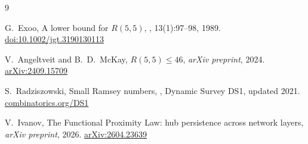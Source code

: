\documentclass[11pt]{article}
\begin{document}

\begin{thebibliography}{9}

G.~Exoo,
\newblock A lower bound for $R(5,5)$,
, 13(1):97--98, 1989.
\newblock \href{https://doi.org/10.1002/jgt.3190130113}{doi:10.1002/jgt.3190130113}

V.~Angeltveit and B.~D.~McKay,
\newblock $R(5,5) \leq 46$,
\newblock \emph{arXiv preprint}, 2024.
\newblock \href{https://arxiv.org/abs/2409.15709}{arXiv:2409.15709}

S.~Radziszowski,
\newblock Small Ramsey numbers,
, Dynamic Survey DS1, updated 2021.
\newblock \href{https://www.combinatorics.org/ojs/index.php/eljc/article/view/DS1}{combinatorics.org/DS1}

V.~Ivanov,
\newblock The Functional Proximity Law: hub persistence across network layers,
\newblock \emph{arXiv preprint}, 2026.
\newblock \href{https://arxiv.org/abs/2604.23639}{arXiv:2604.23639}

\end{thebibliography}
\end{document}
